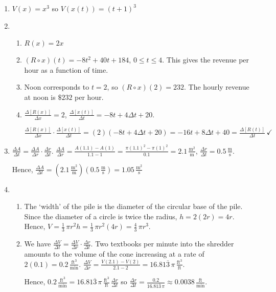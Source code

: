 \begin{enumerate}
\setcounter{enumi}{\value{HW}}

\item $V(x) = x^{3}$ so $V(x(t)) = (t + 1)^{3}$

\item  \begin{enumerate}

\item  $R(x) = 2x$

\item  $\left(R \circ x \right)(t) =  -8t^2+40t+184$, $0 \leq t \leq 4$.  This gives the revenue per hour as a function of time.

\item  Noon corresponds to $t=2$, so $\left(R \circ x \right)(2) = 232$.  The hourly revenue at noon is $\$232$ per hour. 

\item $\frac{\Delta[R(x)]}{\Delta x} = 2$,  $\frac{\Delta[x(t)]}{\Delta t} = -8t + 4 \Delta t + 20$.   

 $\frac{\Delta[R(x)]}{\Delta x} \cdot \frac{\Delta[x(t)]}{\Delta t} = (2)(-8t + 4 \Delta t + 20) =   -16t + 8 \Delta t + 40 = \frac{\Delta[R(t)]}{\Delta t} \, \checkmark$
\end{enumerate}

\item  $\frac{\Delta A}{\Delta t} = \frac{\Delta A}{\Delta r} \cdot \frac{\Delta r}{\Delta t}$.  $\frac{\Delta A}{\Delta r} = \frac{A(1.1) - A(1)}{1.1-1} = \frac{\pi (1.1)^2 - \pi (1)^2}{0.1} = 2.1 \, \frac{\text{m}^2}{\text{m}}$,  $\frac{\Delta r}{\Delta t} = 0.5 \, \frac{\text{m}}{\text{s}}$.

Hence,  $\frac{\Delta A}{\Delta t} = \left( 2.1 \, \frac{\text{m}^2}{\text{m}} \right) \left(0.5 \, \frac{\text{m}}{\text{s}} \right) = 1.05 \,  \frac{\text{m}^2}{\text{s}}$

\item  \begin{enumerate}  \item  The `width' of the pile is the diameter of the circular base of the pile.  Since the diameter of a circle is twice the radius,  $h = 2 (2r) = 4r$.  Hence, $V = \frac{1}{3} \, \pi r^2 h = \frac{1}{3} \, \pi r^2 (4r) = \frac{4}{3} \, \pi r^3$.

\item  We have $\frac{\Delta V}{\Delta t} = \frac{\Delta V}{ \Delta r} \cdot \frac{\Delta r}{\Delta t}$.    Two textbooks per minute into the shredder amounts to the volume of the cone increasing at a rate of $2(0.1) = 0.2 \, \frac{\text{ft}^3}{\text{min}}$.  $\frac{\Delta V}{\Delta r}= \frac{V(2.1) - V(2)}{2.1 - 2} = 16.81\overline{3}  \, \pi \, \frac{\text{ft}^3}{\text{ft}}$.

Hence, $0.2 \, \frac{\text{ft}^3}{\text{min}} = 16.81\overline{3} \, \pi \, \frac{\text{ft}^3}{\text{ft}} \, \frac{\Delta r}{\Delta t}$ so $\frac{\Delta r}{\Delta t} = \frac{0.2}{ 16.81\overline{3} \, \pi }  \approx 0.0038 \, \frac{\text{ft}}{\text{min}}$.



\end{enumerate}

\end{enumerate}


